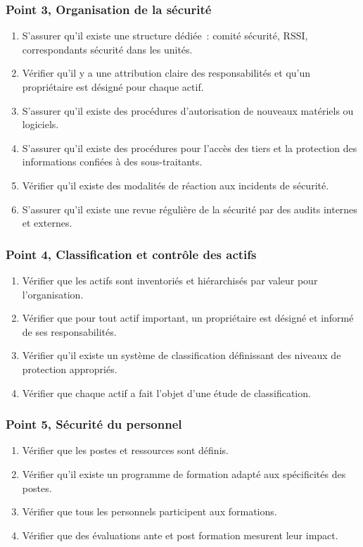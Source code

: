 \subsubsection{Point 3, Organisation de la sécurité}
\begin{enumerate}[label=3.\arabic*.]
    \item S'assurer qu'il existe une structure dédiée~: comité sécurité, RSSI, correspondants sécurité dans les unités.
    \item Vérifier qu'il y a une attribution claire des responsabilités et qu'un propriétaire est désigné pour chaque actif.
    \item S'assurer qu'il existe des procédures d'autorisation de nouveaux matériels ou logiciels.
    \item S'assurer qu'il existe des procédures pour l'accès des tiers et la protection des informations confiées à des sous-traitants.
    \item Vérifier qu'il existe des modalités de réaction aux incidents de sécurité.
    \item S'assurer qu'il existe une revue régulière de la sécurité par des audits internes et externes.
\end{enumerate}

\subsubsection{Point 4, Classification et contrôle des actifs}
\begin{enumerate}[label=4.\arabic*.]
    \item Vérifier que les actifs sont inventoriés et hiérarchisés par valeur pour l'organisation.
    \item Vérifier que pour tout actif important, un propriétaire est désigné et informé de ses responsabilités.
    \item Vérifier qu'il existe un système de classification définissant des niveaux de protection appropriés.
    \item Vérifier que chaque actif a fait l'objet d'une étude de classification.
\end{enumerate}

\subsubsection{Point 5, Sécurité du personnel}
\begin{enumerate}[label=5.\arabic*.]
    \item Vérifier que les postes et ressources sont définis.
    \item Vérifier qu'il existe un programme de formation adapté aux spécificités des postes.
    \item Vérifier que tous les personnels participent aux formations.
    \item Vérifier que des évaluations ante et post formation mesurent leur impact.
\end{enumerate}


